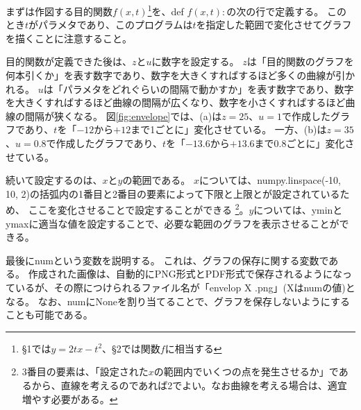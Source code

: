 \documentclass[11pt,a4j]{jarticle}
\begin{document}
まずは作図する目的関数$f(x,t)$\footnote{\S1では$y=2tx-t^{2}$、\S2では関数$f$に相当する}を、def $f(x,t):$の次の行で定義する。
このとき$t$がパラメタであり、このプログラムは$t$を指定した範囲で変化させてグラフを描くことに注意すること。

目的関数が定義できた後は、$z$と$u$に数字を設定する。
$z$は「目的関数のグラフを何本引くか」を表す数字であり、数字を大きくすればするほど多くの曲線が引かれる。
$u$は「パラメタをどれぐらいの間隔で動かすか」を表す数字であり、数字を大きくすればするほど曲線の間隔が広くなり、数字を小さくすればするほど曲線の間隔が狭くなる。
図\ref{fig:envelope}では、(a)は$z=25$、$u=1$で作成したグラフであり、$t$を「$-12$から$+12$まで1ごとに」変化させている。
一方、(b)は$z=35$、$u=0.8$で作成したグラフであり、$t$を「$-13.6$から$+13.6$まで0.8ごとに」変化させている。

続いて設定するのは、$x$と$y$の範囲である。
$x$については、numpy.linspace(-10, 10, 2)の括弧内の1番目と2番目の要素によって下限と上限とが設定されているため、
ここを変化させることで設定することができる
\footnote{3番目の要素は、「設定された$x$の範囲内でいくつの点を発生させるか」であるから、直線を考えるのであれば2でよい。なお曲線を考える場合は、適宜増やす必要がある。}。$y$については、yminとymaxに適当な値を設定することで、必要な範囲のグラフを表示させることができる。

最後にnumという変数を説明する。
これは、グラフの保存に関する変数である。
作成された画像は、自動的にPNG形式とPDF形式で保存されるようになっているが、その際につけられるファイル名が「envelop X .png」(Xはnumの値)となる。
なお、numにNoneを割り当てることで、グラフを保存しないようにすることも可能である。
\end{document}
